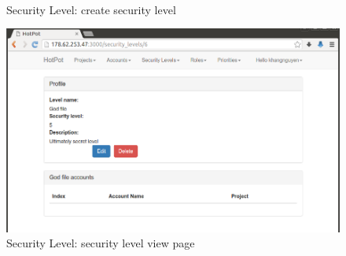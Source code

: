 \begin{figure}[bth]
\myfloatalign
{} \quad
{} \\
\caption[Security Level: create security level]{Security Level: create security level}
\label{fig:user_guide:security_level:level_create}
\end{figure}

\begin{figure}[bth]
\myfloatalign
\includegraphics[width=1.0\linewidth]{gfx/chapter_5/security_level/level_view}
\caption[Security Level: security level view page]{Security Level: security level view page}
\label{fig:user_guide:security_level:level_view}
\end{figure}

